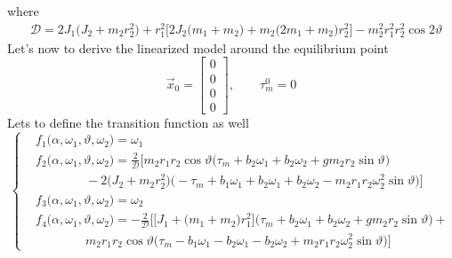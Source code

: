 \documentclass[11pt,a4paper,oneside]{book}
\numberwithin{equation}{section}
\theoremstyle{it}
\theoremstyle{definition}
\begin{document}
where 
\begin{equation}\label{segway_eq_12}
	\begin{aligned}
		&\mathcal{D} = 
		2J_1\big(J_2+m_2r_2^2\big)+r_1^2\Big[2J_2\big(m_1+m_2\big)+m_2\big(
		2m_1+m_2\big)r_2^2\Big]-m_2^2r_1^2r_2^2\cos2\vartheta
	\end{aligned}
\end{equation}
Let's now to derive the linearized model around the equilibrium point 
\begin{equation}\label{segway_eq_13}
	\vec{x}_0=\begin{bmatrix}
		0 \\ 0 \\ 0 \\ 0
	\end{bmatrix}, \qquad\tau_m^0=0
\end{equation}
Lets to define the transition function as well
\begin{equation}\label{segway_eq_14}
	\left\lbrace 	\begin{aligned}
		&f_1\big(\alpha,\omega_1,\vartheta,\omega_2\big)=\omega_{1} \\[6pt]
		&f_2\big(\alpha,\omega_1,\vartheta,\omega_2\big)= 
		\frac{2}{\mathcal{D}}\Bigg[
		m_2r_1r_2\cos\vartheta\Big(\tau_m+b_2\omega_1+b_2\omega_2+
		gm_2r_2\sin\vartheta\Big)\\[6pt]
		&\qquad\qquad -2\Big(J_2+m_2r_2^2\Big)\Big(-\tau_m+b_1\omega_1 
		+b_2\omega_1+b_2\omega_2- m_2r_1r_2\omega_2^2\sin\vartheta\Big)
		\Bigg]\\[6pt]
		&f_3\big(\alpha,\omega_1,\vartheta,\omega_2\big)=\omega_{2} \\[6pt]
		&f_4\big(\alpha,\omega_1,\vartheta,\omega_2\big) = 
		-\frac{2}{\mathcal{D}}\Bigg[\Big[J_1+\big(m_1+m_2\big)r_1^2\Big]\Big(
		\tau_m+b_2\omega_1+b_2\omega_2+gm_2r_2\sin\vartheta\Big)+ \\[6pt]
		&\qquad\qquad m_2r_1r_2\cos\vartheta\Big(
		\tau_m-b_1\omega_1-b_2\omega_1-b_2\omega_2+m_2r_1r_2\omega_2^2\sin\vartheta
		\Big)\Bigg]
	\end{aligned}\right. 
\end{equation}
\end{document}
